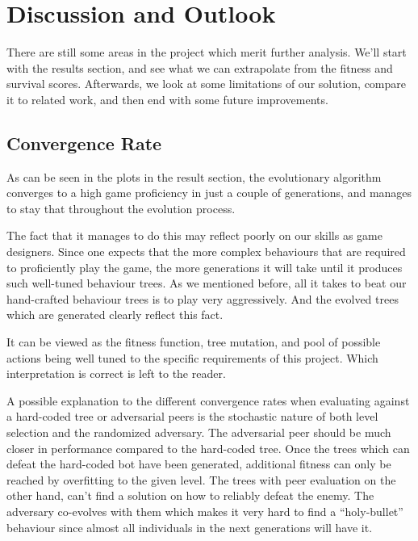 \documentclass[a4paper, twocolumn]{article}
\begin{document}
        \clearpage

    \section{Discussion and Outlook} \label{sec:discussion_and_outlook}

    There are still some areas in the project which merit further analysis. We'll start with the results section, and see what we can extrapolate from the fitness and survival scores. Afterwards, we look at some limitations of our solution, compare it to related work, and then end with some future improvements.

    \subsection*{Convergence Rate}

    As can be seen in the plots in the result section, the evolutionary algorithm converges to a high game proficiency in just a couple of generations, and manages to stay that throughout the evolution process.

    The fact that it manages to do this may reflect poorly on our skills as game designers. Since one expects that the more complex behaviours that are required to proficiently play the game, the more generations it will take until it produces such well-tuned behaviour trees. As we mentioned before, all it takes to beat our hand-crafted behaviour trees is to play very aggressively. And the evolved trees which are generated clearly reflect this fact.

    It can be viewed as the fitness function, tree mutation, and pool of possible actions being well tuned to the specific requirements of this project. Which interpretation is correct is left to the reader.

    A possible explanation to the different convergence rates when evaluating against a hard-coded tree or adversarial peers is the stochastic nature of both level selection and the randomized adversary. The adversarial peer should be much closer in performance compared to the hard-coded tree. Once the trees which can defeat the hard-coded bot have been generated, additional fitness can only be reached by overfitting to the given level. The trees with peer evaluation on the other hand, can't find a solution on how to reliably defeat the enemy. The adversary co-evolves with them which makes it very hard to find a ``holy-bullet'' behaviour since almost all individuals in the next generations will have it.
\end{document}
